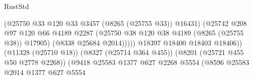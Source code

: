 \begin{lexlean}{RustStd}
\begin{coremodule}
{\begin{coremodule}
{{{{{{{{{{{{{{{{{{{{{{{{{{{{{{{{{{{{{{{{{{{{{{{{{{{{{{                                                          (@25750
                                                            @33
                                                            @120
                                                            @33
                                                            @3457
                                                            (@8265 (@25755 @33))
                                                            @16431)
                                                          (@25742
                                                            @208
                                                            @97
                                                            @120
                                                            @66
                                                            @4189
                                                            @2287
                                                            (@25750
                                                              @38
                                                              @120
                                                              @38
                                                              @4189
                                                              (@8265 (@25755 @38))
                                                              @17905)
                                                            (@8338 @25684 @2014)))))
                                                    @18397
                                                    @18400
                                                    @18403
                                                    @18406))
                                                (@11328 (@25710 @18))
                                                (@8327 (@25714 @364 @455))
                                                (@8201 (@25721 @455 @50 @2778 @2268))
                                                (@9418
                                                  @25583
                                                  @1377
                                                  @627
                                                  @2268
                                                  @5554
                                                  (@8596
                                                    @25583
                                                    @2014
                                                    @1377
                                                    @627
                                                    @5554
}}}}}}}}}}}}}}}}}}}}}}}}}}}}}}}}}}}}}}}}}}}}}}}}}}}}}}
\end{coremodule}}
\end{coremodule}
\end{lexlean}
